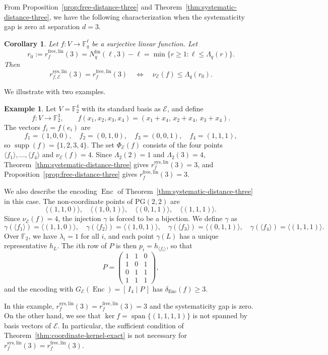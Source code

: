 \documentclass[a4paper,12pt]{article}
\theoremstyle{plain}
\newtheorem{corollary}[lemma]{Corollary}
\theoremstyle{definition}
\newtheorem{example}[lemma]{Example}
\newcommand{\F}{\mathbb F}
\newcommand{\Enc}{\operatorname{Enc}}
\newcommand{\Nlin}{N_q^{\mathrm{lin}}}
\begin{document}
 From Proposition~\ref{prop:free-distance-three} and Theorem~\ref{thm:systematic-distance-three}, we have the following characterization when the systematicity gap is zero at separation $d=3$.
\begin{corollary}
\label{cor:systematic-equality-distance-three}
Let $f\colon V\to\F_q^\ell$ be a surjective linear function. Let 
\[
r_0
:=
r_f^{\mathrm{free,lin}}(3)
=
\Nlin(\ell,3)-\ell
=
\min\{r\geq1:\ell\leq\Lambda_q(r)\}.
\]
Then
\[ 
r_{f,\mathcal E}^{\mathrm{sys,lin}}(3)
=
r_f^{\mathrm{free,lin}}(3)
\quad\Longleftrightarrow\quad
\nu_{\mathcal E}(f)\leq\Lambda_q(r_0).
\]
\end{corollary}
 




We illustrate with two examples.

\begin{example}
\label{ex:noncoordinate-equality}
Let $V=\F_2^4$ with its standard basis as $\mathcal E$, and define
\[
f\colon V\longrightarrow\F_2^3,
\qquad
f(x_1,x_2,x_3,x_4)
=
(x_1+x_4,\,x_2+x_4,\,x_3+x_4).
\]
The vectors $f_i=f(e_i)$ are
\[
f_1=(1,0,0),\quad f_2=(0,1,0),\quad f_3=(0,0,1),\quad f_4=(1,1,1),
\]
so $\operatorname{supp}(f)=\{1,2,3,4\}$.
The set
$\Phi_{\mathcal E}(f)$ consists of the four points
$\langle f_1\rangle,\dots,\langle f_4\rangle$ and
$\nu_{\mathcal E}(f)=4$. Since $\Lambda_2(2)=1$ and
$\Lambda_2(3)=4$, Theorem~\ref{thm:systematic-distance-three} gives
$r_f^{\mathrm{sys,lin}}(3)=3$, and
Proposition~\ref{prop:free-distance-three} gives
$r_f^{\mathrm{free,lin}}(3)=3$.

We also describe the  encoding $\Enc$ of
Theorem~\ref{thm:systematic-distance-three} in this case. 
The non-coordinate points of $\mathrm{PG}(2,2)$ are
\[
\langle(1,1,0)\rangle,\quad
\langle(1,0,1)\rangle,\quad
\langle(0,1,1)\rangle,\quad
\langle(1,1,1)\rangle.
\]
Since
$\nu_{\mathcal E}(f)=4$, the injection $\gamma$ is
forced to be a bijection. We define $\gamma$ as
\[
\gamma(\langle f_1\rangle)=\langle(1,1,0)\rangle,\quad
\gamma(\langle f_2\rangle)=\langle(1,0,1)\rangle,\quad
\gamma(\langle f_3\rangle)=\langle(0,1,1)\rangle,\quad
\gamma(\langle f_4\rangle)=\langle(1,1,1)\rangle.
\]
Over $\F_2$, we have $\lambda_i=1$ for all $i$, and  each point $\gamma(L)$ has a unique representative $h_L$. 
The $i$th row of $P$ is then
$p_i=h_{\langle f_i\rangle}$, so that
\[
P=
\begin{pmatrix}
1&1&0\\
1&0&1\\
0&1&1\\
1&1&1
\end{pmatrix},
\]
and the encoding with $G_{\mathcal E}(\Enc)=[\,I_4\mid P\,]$ has
$\delta_{\Enc}(f)\geq3$.

In this example,  $r_f^{\mathrm{sys,lin}}(3)=r_f^{\mathrm{free,lin}}(3)=3$ and the systematicity gap is zero. 
On the other hand, we see that $\ker f=\operatorname{span}\{(1,1,1,1)\}$ is not spanned by basis vectors of $\mathcal{E}$. In particular, the sufficient condition of
Theorem~\ref{thm:coordinate-kernel-exact} is not necessary for
$r_f^{\mathrm{sys,lin}}(3)=r_f^{\mathrm{free,lin}}(3)$.
\end{example} 
\end{document}
